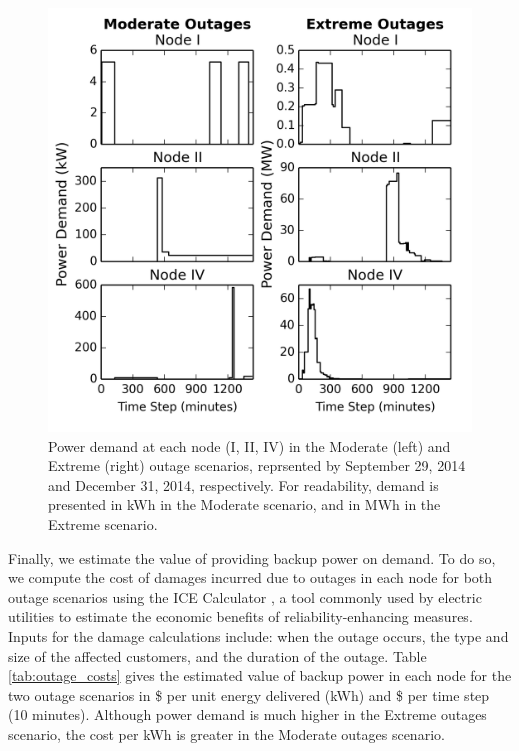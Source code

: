 \documentclass[journal]{IEEEtran}
\begin{document}
\begin{figure}[!htbp]
  \includegraphics[width=\linewidth]{plots/power_demand.png}
  \caption{Power demand at each node (I, II, IV) in the Moderate (left) and Extreme (right) outage scenarios, reprsented by September 29, 2014 and December 31, 2014, respectively. For readability, demand is presented in kWh in the Moderate scenario, and in MWh in the Extreme scenario.}
  \label{fig:power_demand}
\end{figure}

Finally, we estimate the value of providing backup power on demand. To do so, we compute the cost of damages incurred due to outages in each node for both outage scenarios using the ICE Calculator \cite{ice_calculator_2015}, a tool commonly used by electric utilities to estimate the economic benefits of reliability-enhancing measures. Inputs for the damage calculations include: when the outage occurs, the type and size of the affected customers, and the duration of the outage. Table \ref{tab:outage_costs} gives the estimated value of backup power in each node for the two outage scenarios in \$ per unit energy delivered (kWh) and \$ per time step (10 minutes). Although power demand is much higher in the Extreme outages scenario, the cost per kWh is greater in the Moderate outages scenario.
\end{document}
